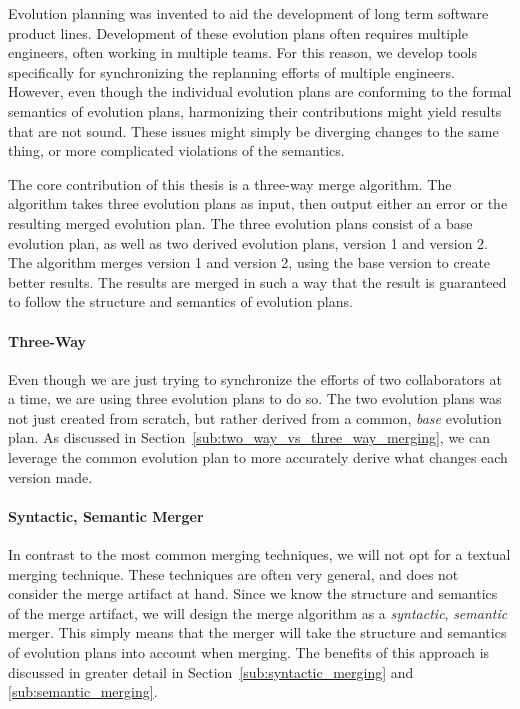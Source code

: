 \documentclass[a4paper,english]{ifimaster}
\begin{document}
Evolution planning was invented to aid the development of long term software product lines. Development of these evolution plans often requires multiple engineers, often working in multiple teams. For this reason, we develop tools specifically for synchronizing the replanning efforts of multiple engineers. However, even though the individual evolution plans are conforming to the formal semantics of evolution plans, harmonizing their contributions might yield results that are not sound. These issues might simply be diverging changes to the same thing, or more complicated violations of the semantics.

The core contribution of this thesis is a three-way merge algorithm. The algorithm takes three evolution plans as input, then output either an error or the resulting merged evolution plan. The three evolution plans consist of a base evolution plan, as well as two derived evolution plans, version 1 and version 2. The algorithm merges version 1 and version 2, using the base version to create better results. The results are merged in such a way that the result is guaranteed to follow the structure and semantics of evolution plans.

\paragraph{Three-Way}%
\label{par:three_way}

Even though we are just trying to synchronize the efforts of two collaborators at a time, we are using three evolution plans to do so. The two evolution plans was not just created from scratch, but rather derived from a common, \textit{base} evolution plan. As discussed in Section~\vref{sub:two_way_vs_three_way_merging}, we can leverage the common evolution plan to more accurately derive what changes each version made.

\paragraph{Syntactic, Semantic Merger}%
\label{par:semantic_merger}

In contrast to the most common merging techniques, we will not opt for a textual merging technique. These techniques are often very general, and does not consider the merge artifact at hand. Since we know the structure and semantics of the merge artifact, we will design the merge algorithm as a \textit{syntactic}, \textit{semantic} merger. This simply means that the merger will take the structure and semantics of evolution plans into account when merging. The benefits of this approach is discussed in greater detail in Section~\vref{sub:syntactic_merging} and \vref{sub:semantic_merging}.
\end{document}
